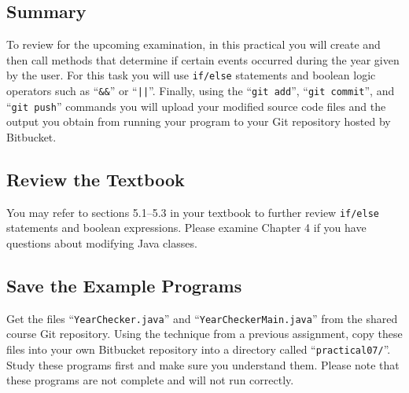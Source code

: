 



\subsection*{Summary}
\vspace*{-.05in}

To review for the upcoming examination, in this practical you will create and then call methods that determine if
certain events occurred during the year given by the user. For this task you will use {\tt if/else} statements and
boolean logic operators such as ``{\tt \&\&}'' or ``{\tt ||}''. Finally, using the ``{\tt git add}'', ``{\tt git
commit}'', and ``{\tt git push}'' commands you will upload your modified source code files and the output you obtain
from running your program to your Git repository hosted by Bitbucket.

\vspace*{-.1in}
\subsection*{Review the Textbook}
\vspace*{-.05in}

You may refer to sections 5.1--5.3 in your textbook to further review {\tt if/else} statements and boolean
expressions. Please examine Chapter 4 if you have questions about modifying Java classes.

\vspace*{-.1in}
\subsection*{Save the Example Programs}
\vspace*{-.05in}

Get the files ``{\tt YearChecker.java}'' and ``{\tt YearCheckerMain.java}'' from the shared course Git repository. Using
the technique from a previous assignment, copy these files into your own Bitbucket repository into a directory called
``{\tt practical07/}''. Study these programs first and make sure you understand them. Please note that these programs
are not complete and will not run correctly.

\vspace*{-.1in}

